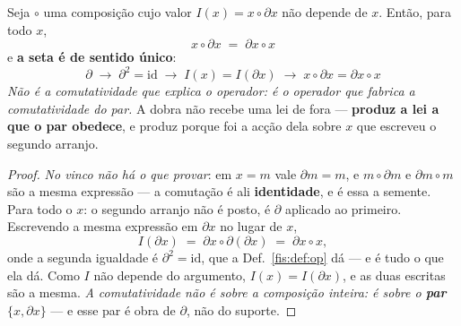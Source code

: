 \documentclass[livro.tex]{subfiles}
\begin{document}
\begin{lema}\label{fis:lem:comutapar}
Seja $\circ$ uma composição cujo valor $I(x)=x\circ\partial x$ não depende de
$x$. Então, para todo $x$,
\[
\boxed{\;x\circ\partial x\;=\;\partial x\circ x\;}
\]
e \textbf{a seta é de sentido único}:
\[
\boxed{\;\partial\;\longrightarrow\;\partial^{2}=\mathrm{id}\;\longrightarrow\;I(x)=I(\partial x)\;\longrightarrow\;x\circ\partial x=\partial x\circ x\;}
\]
\emph{Não é a comutatividade que explica o operador: é o operador que fabrica a
comutatividade do par.} A dobra não recebe uma lei de fora --- \textbf{produz a
lei a que o par obedece}, e produz porque foi a acção dela sobre $x$ que
escreveu o segundo arranjo.
\end{lema}

\begin{proof}
\emph{No vinco não há o que provar}: em $x=m$ vale $\partial m=m$, e
$m\circ\partial m$ e $\partial m\circ m$ são a mesma expressão --- a comutação é
ali \textbf{identidade}, e é essa a semente. Para todo o $x$: o segundo arranjo
não é posto, é $\partial$ aplicado ao primeiro. Escrevendo a
mesma expressão em $\partial x$ no lugar de $x$,
\[
I(\partial x)\;=\;\partial x\circ\partial(\partial x)\;=\;\partial x\circ x ,
\]
onde a segunda igualdade é $\partial^{2}=\mathrm{id}$, que a
Def.~\ref{fis:def:op} dá --- e é tudo o que ela dá. Como $I$ não depende do
argumento, $I(x)=I(\partial x)$, e as duas escritas são a mesma. \emph{A
comutatividade não é sobre a composição inteira: é sobre o \textbf{par}
$\{x,\partial x\}$} --- e esse par é obra de $\partial$, não do suporte.
\end{proof}
\end{document}
